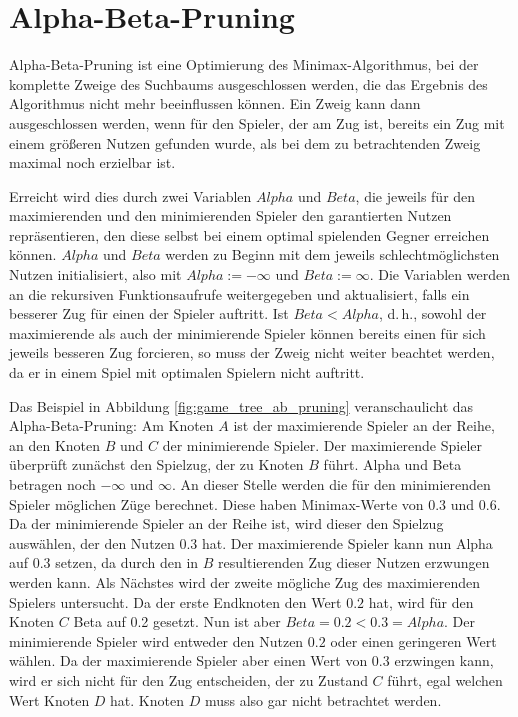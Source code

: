 \section{Alpha-Beta-Pruning}
\label{sec:alphabeta}

Alpha-Beta-Pruning ist eine Optimierung des Minimax-Algorithmus, bei der komplette Zweige des Suchbaums ausgeschlossen
werden, die das Ergebnis des Algorithmus nicht mehr beeinflussen können. Ein Zweig kann dann ausgeschlossen werden, wenn
für den Spieler, der am Zug ist, bereits ein Zug mit einem größeren Nutzen gefunden wurde, als bei dem zu betrachtenden Zweig
maximal noch erzielbar ist.

Erreicht wird dies durch zwei Variablen $Alpha$ und $Beta$, die jeweils für den maximierenden und den minimierenden
Spieler den garantierten Nutzen repräsentieren, den diese selbst bei einem optimal spielenden Gegner erreichen können.
$Alpha$ und $Beta$ werden zu Beginn mit dem jeweils schlechtmöglichsten Nutzen initialisiert, also mit $Alpha := -\infty$ und
$Beta := \infty$. Die Variablen werden an die rekursiven Funktionsaufrufe weitergegeben und aktualisiert, falls ein besserer Zug für
einen der Spieler auftritt. Ist $Beta < Alpha$, d.\,h., sowohl der maximierende als auch der minimierende
Spieler können bereits einen für sich jeweils besseren Zug forcieren, so muss der Zweig nicht weiter beachtet werden, da
er in einem Spiel mit optimalen Spielern nicht auftritt.
\cite[S.~167]{ai2010russel}

Das Beispiel in Abbildung \ref{fig:game_tree_ab_pruning} veranschaulicht das Alpha-Beta-Pruning: Am Knoten $A$ ist der
maximierende Spieler an der Reihe, an den Knoten $B$ und $C$ der minimierende Spieler. Der maximierende Spieler
überprüft zunächst den Spielzug, der zu Knoten $B$ führt. Alpha und Beta betragen noch $-\infty$ und $\infty$. An dieser
Stelle werden die für den minimierenden Spieler möglichen Züge berechnet. Diese haben Minimax-Werte von $0.3$ und $0.6$.
Da der minimierende Spieler an der Reihe ist, wird dieser den Spielzug auswählen, der den Nutzen $0.3$ hat. Der
maximierende Spieler kann nun Alpha auf 0.3 setzen, da durch den in $B$ resultierenden Zug dieser Nutzen erzwungen
werden kann. Als Nächstes wird der zweite mögliche Zug des maximierenden Spielers untersucht. Da der erste Endknoten den
Wert $0.2$ hat, wird für den Knoten $C$ Beta auf 0.2 gesetzt. Nun ist aber $Beta=0.2<0.3=Alpha$. Der minimierende
Spieler wird entweder den Nutzen $0.2$ oder einen geringeren Wert wählen. Da der maximierende Spieler aber einen Wert
von $0.3$ erzwingen kann, wird er sich nicht für den Zug entscheiden, der zu Zustand $C$ führt, egal welchen Wert Knoten
$D$ hat. Knoten $D$ muss also gar nicht betrachtet werden.

